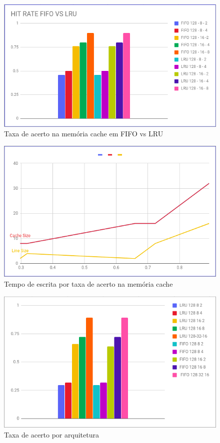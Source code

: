 \documentclass[conference]{IEEEtran}
\begin{document}
\begin{figure}
    \centering
    \includegraphics[width=\linewidth]{Imagens/Hit_RATE_FIFO_VS_LRU.png}
    \caption{Taxa de acerto na memória cache em FIFO vs LRU}
    \label{fig:Taxa de acerto na memória cache em FIFO vs LRU}
\end{figure}

\begin{figure}
    \centering
    \includegraphics[width=\linewidth]{Imagens/WRITE_TIME_POR_HIT_RATE.png}
    \caption{Tempo de escrita por taxa de acerto na memória cache}
    \label{fig:Tempo de escrita por taxa de acerto na memória cache}
\end{figure}

\begin{figure}
    \centering
    \includegraphics[width=\linewidth]{Imagens/HIT_RATE_POR_ARQUITETURA.png}
    \caption{Taxa de acerto por arquitetura}
    \label{fig:Taxa de acerto por arquitetura}
\end{figure}
\end{document}
